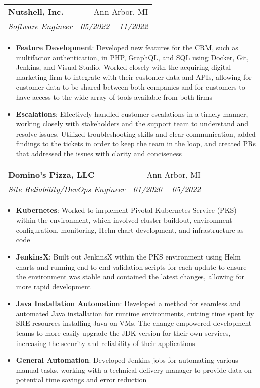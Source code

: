 \documentclass[letterpaper,10pt]{article}
\makeatletter
\newcommand{\resumeItem}[2]{
  \item\small{
    \textbf{#1}{: #2 \vspace{-2pt}}
  }
}
\newcommand{\resumeSubheading}[4]{
  \vspace{-1pt}\item
    \begin{tabular*}{0.97\textwidth}[t]{l@{\extracolsep{\fill}}r}
      \textbf{#1} & #2 \\
      \textit{\small#3} & \textit{\small #4} \\
    \end{tabular*}\vspace{-5pt}
}
\newcommand{\resumeItemListStart}{\begin{itemize}}
\newcommand{\resumeItemListEnd}{\end{itemize}\vspace{-5pt}}
\makeatother
\begin{document}
    \resumeSubheading
      {Nutshell, Inc.}{Ann Arbor, MI}
      {Software Engineer}{05/2022 -- 11/2022}
      \resumeItemListStart
        \resumeItem{Feature Development}
          {Developed new features for the CRM, such as multifactor authentication, in PHP, GraphQL, and SQL using Docker, Git, Jenkins, and Visual Studio. Worked closely with the acquiring digital marketing firm to integrate with their customer data and APIs, allowing for customer data to be shared between both companies and for customers to have access to the wide array of tools available from both firms}
        \resumeItem{Escalations}
          {Effectively handled customer escalations in a timely manner, working closely with stakeholders and the support team to understand and resolve issues. Utilized troubleshooting skills and clear communication, added findings to the tickets in order to keep the team in the loop, and created PRs that addressed the issues with clarity and conciseness}
      \resumeItemListEnd

    \resumeSubheading
      {Domino's Pizza, LLC}{Ann Arbor, MI}
      {Site Reliability/DevOps Engineer}{01/2020 -- 05/2022}
      \resumeItemListStart
        \resumeItem{Kubernetes}
          {Worked to implement Pivotal Kubernetes Service (PKS) within the environment, which involved cluster buildout, environment configuration, monitoring, Helm chart development, and infrastructure-as-code}
        \resumeItem{JenkinsX}
          {Built out JenkinsX within the PKS environment using Helm charts and running end-to-end validation scripts for each update to ensure the environment was stable and contained the latest changes, allowing for more rapid development}
        \resumeItem{Java Installation Automation}
          {Developed a method for seamless and automated Java installation for runtime environments, cutting time spent by SRE resources installing Java on VMs. The change empowered development teams to more easily upgrade the JDK version for their own services, increasing the security and reliability of their applications}
        \resumeItem{General Automation}
          {Developed Jenkins jobs for automating various manual tasks, working with a technical delivery manager to provide data on potential time savings and error reduction}
      \resumeItemListEnd
\end{document}
